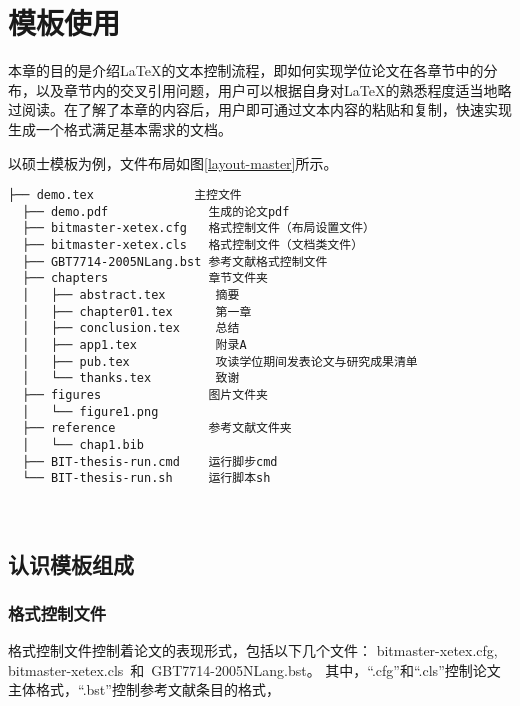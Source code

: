 
\chapter{模板使用}
\label{chap:textStructure}

本章的目的是介绍\LaTeX{}的文本控制流程，即如何实现学位论文在各章节中的分布，以及章节内的交叉引用问题，用户可以根据自身对\LaTeX{}的熟悉程度适当地略过阅读。在了解了本章的内容后，用户即可通过文本内容的粘贴和复制，快速实现生成一个格式满足基本需求的文档。

以硕士模板为例，文件布局如图\ref{layout-master}所示。

\begin{lstlisting}[basicstyle=\small\ttfamily,caption={BIT-thesis-template-master 模板文件布局},label=layout-master,numbers=none]
  ├── demo.tex              主控文件
  ├── demo.pdf              生成的论文pdf
  ├── bitmaster-xetex.cfg   格式控制文件（布局设置文件）
  ├── bitmaster-xetex.cls   格式控制文件（文档类文件）
  ├── GBT7714-2005NLang.bst 参考文献格式控制文件
  ├── chapters              章节文件夹
  │   ├── abstract.tex       摘要
  │   ├── chapter01.tex      第一章
  │   ├── conclusion.tex     总结
  │   ├── app1.tex           附录A
  │   ├── pub.tex            攻读学位期间发表论文与研究成果清单
  │   └── thanks.tex         致谢
  ├── figures               图片文件夹
  │   └── figure1.png   
  ├── reference             参考文献文件夹
  │   └── chap1.bib
  ├── BIT-thesis-run.cmd    运行脚步cmd
  └── BIT-thesis-run.sh     运行脚本sh
  
      
\end{lstlisting}

\section{认识模板组成}

\subsection{格式控制文件}
\label{sec:format}

格式控制文件控制着论文的表现形式，包括以下几个文件：
bitmaster-xetex.cfg, bitmaster-xetex.cls~和~GBT7714-2005NLang.bst。
其中，``.cfg''和``.cls''控制论文主体格式，``.bst''控制参考文献条目的格式，


